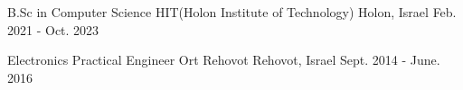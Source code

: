 

\begin{cventries}

  \cventry
    {B.Sc in Computer Science} %
    {HIT(Holon Institute of Technology)} %
    {Holon, Israel} %
    {Feb. 2021 - Oct. 2023} %
     {
     }

  \cventry
    {Electronics Practical Engineer} %
    {Ort Rehovot} %
    {Rehovot, Israel} %
    {Sept. 2014 - June. 2016} %
     {
     }


\end{cventries}

